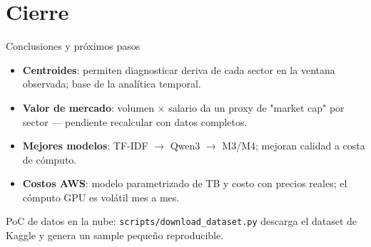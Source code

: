 \documentclass[aspectratio=169]{beamer}
\begin{document}
\section{Cierre}

\begin{frame}{Conclusiones y próximos pasos}
  \begin{itemize}
    \item \textbf{Centroides}: permiten diagnosticar deriva de cada sector en la
          ventana observada; base de la analítica temporal.
    \item \textbf{Valor de mercado}: volumen $\times$ salario da un proxy de
          "market cap" por sector --- pendiente recalcular con datos completos.
    \item \textbf{Mejores modelos}: TF-IDF $\rightarrow$ Qwen3 $\rightarrow$
          M3/M4; mejoran calidad a costa de cómputo.
    \item \textbf{Costos AWS}: modelo parametrizado de TB y costo con precios
          reales; el cómputo GPU es volátil mes a mes.
  \end{itemize}
  \vfill
  \footnotesize PoC de datos en la nube: \texttt{scripts/download\_dataset.py}
  descarga el dataset de Kaggle y genera un sample pequeño reproducible.
\end{frame}
\end{document}
